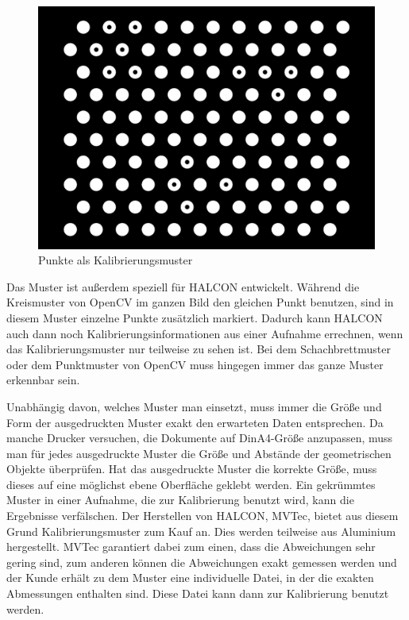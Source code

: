 \begin{figure}[!hbt]
	\centering
	\vspace{1ex}
	\includegraphics[scale=0.2]{../images/caltab_hex_10x11}
	\caption[Punkte als Kalibrierungsmuster]{\label{img:caltab_hex_10x11} Punkte als Kalibrierungsmuster}
	\vspace{1ex}
\end{figure}

Das Muster ist außerdem speziell für HALCON entwickelt. Während die Kreismuster von OpenCV im ganzen Bild den gleichen Punkt benutzen, sind in diesem Muster einzelne Punkte zusätzlich markiert. Dadurch kann HALCON auch dann noch Kalibrierungsinformationen aus einer Aufnahme errechnen, wenn das Kalibrierungsmuster nur teilweise zu sehen ist. Bei dem Schachbrettmuster oder dem Punktmuster von OpenCV muss hingegen immer das ganze Muster erkennbar sein.

Unabhängig davon, welches Muster man einsetzt, muss immer die Größe und Form der ausgedruckten Muster exakt den erwarteten Daten entsprechen. Da manche Drucker versuchen, die Dokumente auf DinA4-Größe anzupassen, muss man für jedes ausgedruckte Muster die Größe und Abstände der geometrischen Objekte überprüfen. Hat das ausgedruckte Muster die korrekte Größe, muss dieses auf eine möglichst ebene Oberfläche geklebt werden. Ein gekrümmtes Muster in einer Aufnahme, die zur Kalibrierung benutzt wird, kann die Ergebnisse verfälschen. Der Herstellen von HALCON, MVTec, bietet aus diesem Grund Kalibrierungsmuster zum Kauf an. Dies werden teilweise aus Aluminium hergestellt. MVTec garantiert dabei zum einen, dass die Abweichungen sehr gering sind, zum anderen können die Abweichungen exakt gemessen werden und der Kunde erhält zu dem Muster eine individuelle Datei, in der die exakten Abmessungen enthalten sind. Diese Datei kann dann zur Kalibrierung benutzt werden.

